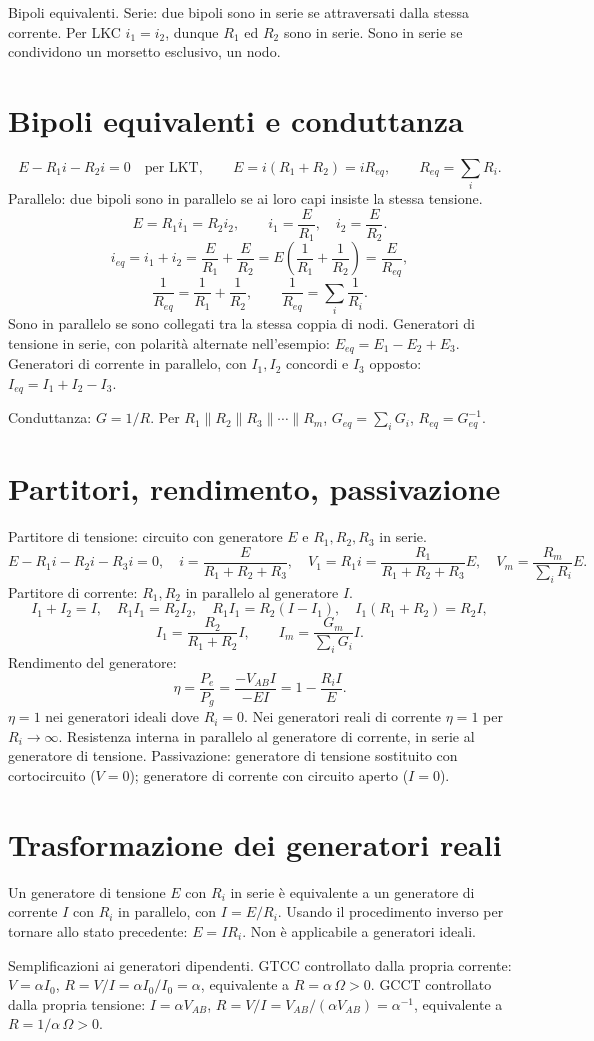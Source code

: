 \documentclass[11pt,a4paper]{article}
\newcommand{\pagina}[2]{\clearpage\section*{#2}}
\begin{document}
Bipoli equivalenti. Serie: due bipoli sono in serie se attraversati dalla stessa corrente. Per LKC $i_1=i_2$, dunque $R_1$ ed $R_2$ sono in serie. Sono in serie se condividono un morsetto esclusivo, un nodo.
\pagina{6}{Bipoli equivalenti e conduttanza}
\[E-R_1i-R_2i=0\quad\text{per LKT},\qquad E=i(R_1+R_2)=iR_{eq},\qquad R_{eq}=\sum_iR_i.\]
Parallelo: due bipoli sono in parallelo se ai loro capi insiste la stessa tensione.
\[E=R_1i_1=R_2i_2,\qquad i_1=\frac E{R_1},\quad i_2=\frac E{R_2}.\]
\[i_{eq}=i_1+i_2=\frac E{R_1}+\frac E{R_2}=E\left(\frac1{R_1}+\frac1{R_2}\right)=\frac E{R_{eq}},\]
\[\frac1{R_{eq}}=\frac1{R_1}+\frac1{R_2},\qquad\frac1{R_{eq}}=\sum_i\frac1{R_i}.\]
Sono in parallelo se sono collegati tra la stessa coppia di nodi. Generatori di tensione in serie, con polarità alternate nell'esempio: $E_{eq}=E_1-E_2+E_3$. Generatori di corrente in parallelo, con $I_1,I_2$ concordi e $I_3$ opposto: $I_{eq}=I_1+I_2-I_3$.

Conduttanza: $G=1/R$. Per $R_1\parallel R_2\parallel R_3\parallel\cdots\parallel R_m$, $G_{eq}=\sum_iG_i$, $R_{eq}=G_{eq}^{-1}$.
\pagina{7}{Partitori, rendimento, passivazione}
Partitore di tensione: circuito con generatore $E$ e $R_1,R_2,R_3$ in serie.
\[E-R_1i-R_2i-R_3i=0,\quad i=\frac E{R_1+R_2+R_3},\quad V_1=R_1i=\frac{R_1}{R_1+R_2+R_3}E,\quad V_m=\frac{R_m}{\sum_iR_i}E.\]
Partitore di corrente: $R_1,R_2$ in parallelo al generatore $I$.
\[I_1+I_2=I,\quad R_1I_1=R_2I_2,\quad R_1I_1=R_2(I-I_1),\quad I_1(R_1+R_2)=R_2I,\]
\[I_1=\frac{R_2}{R_1+R_2}I,\qquad I_m=\frac{G_m}{\sum_iG_i}I.\]
Rendimento del generatore:
\[\eta=\frac{P_e}{P_g}=\frac{-V_{AB}I}{-EI}=1-\frac{R_iI}{E}.\]
$\eta=1$ nei generatori ideali dove $R_i=0$. Nei generatori reali di corrente $\eta=1$ per $R_i\to\infty$. Resistenza interna in parallelo al generatore di corrente, in serie al generatore di tensione. Passivazione: generatore di tensione sostituito con cortocircuito ($V=0$); generatore di corrente con circuito aperto ($I=0$).
\pagina{8}{Trasformazione dei generatori reali}
Un generatore di tensione $E$ con $R_i$ in serie è equivalente a un generatore di corrente $I$ con $R_i$ in parallelo, con $I=E/R_i$. Usando il procedimento inverso per tornare allo stato precedente: $E=IR_i$. Non è applicabile a generatori ideali.

Semplificazioni ai generatori dipendenti. GTCC controllato dalla propria corrente: $V=\alpha I_0$, $R=V/I=\alpha I_0/I_0=\alpha$, equivalente a $R=\alpha\,\Omega>0$. GCCT controllato dalla propria tensione: $I=\alpha V_{AB}$, $R=V/I=V_{AB}/(\alpha V_{AB})=\alpha^{-1}$, equivalente a $R=1/\alpha\,\Omega>0$.
\end{document}

